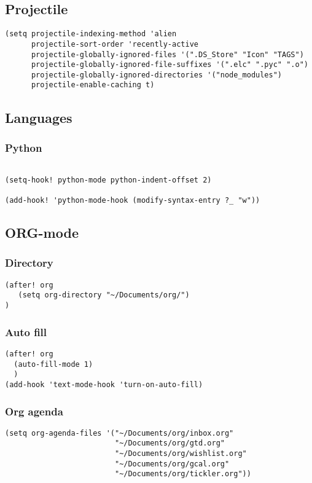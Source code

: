 \documentclass[11pt]{article}
\begin{document}
\subsection{Projectile}
\label{sec:orgb601544}
\begin{verbatim}
(setq projectile-indexing-method 'alien
      projectile-sort-order 'recently-active
      projectile-globally-ignored-files '(".DS_Store" "Icon" "TAGS")
      projectile-globally-ignored-file-suffixes '(".elc" ".pyc" ".o")
      projectile-globally-ignored-directories '("node_modules")
      projectile-enable-caching t)
\end{verbatim}
\subsection{Languages}
\label{sec:orgefafce7}
\subsubsection{Python}
\label{sec:org7e6f637}
\begin{verbatim}

(setq-hook! python-mode python-indent-offset 2)

(add-hook! 'python-mode-hook (modify-syntax-entry ?_ "w"))
\end{verbatim}
\subsection{ORG-mode}
\label{sec:org2769881}
\subsubsection{Directory}
\label{sec:orgc7563ca}
\begin{verbatim}
(after! org
   (setq org-directory "~/Documents/org/")
)

\end{verbatim}
\subsubsection{Auto fill}
\label{sec:org1a28cb9}
\begin{verbatim}
(after! org
  (auto-fill-mode 1)
  )
(add-hook 'text-mode-hook 'turn-on-auto-fill)
\end{verbatim}
\subsubsection{Org agenda}
\label{sec:org408d45d}
\begin{verbatim}
(setq org-agenda-files '("~/Documents/org/inbox.org"
                         "~/Documents/org/gtd.org"
                         "~/Documents/org/wishlist.org"
                         "~/Documents/org/gcal.org"
                         "~/Documents/org/tickler.org"))
\end{verbatim}
\end{document}
